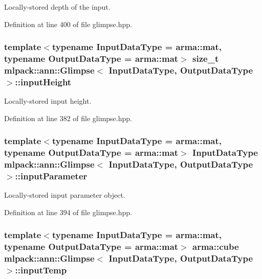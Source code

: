 Locally-\/stored depth of the input. 



Definition at line 400 of file glimpse.\+hpp.

\subsubsection[{input\+Height}]{\setlength{\rightskip}{0pt plus 5cm}template$<$typename Input\+Data\+Type  = arma\+::mat, typename Output\+Data\+Type  = arma\+::mat$>$ size\+\_\+t {\bf mlpack\+::ann\+::\+Glimpse}$<$ Input\+Data\+Type, Output\+Data\+Type $>$\+::input\+Height\hspace{0.3cm}{\ttfamily [private]}}\label{classmlpack_1_1ann_1_1Glimpse_a6a98b1b52646276f7044fca8fc557069}


Locally-\/stored input height. 



Definition at line 382 of file glimpse.\+hpp.

\subsubsection[{input\+Parameter}]{\setlength{\rightskip}{0pt plus 5cm}template$<$typename Input\+Data\+Type  = arma\+::mat, typename Output\+Data\+Type  = arma\+::mat$>$ Input\+Data\+Type {\bf mlpack\+::ann\+::\+Glimpse}$<$ Input\+Data\+Type, Output\+Data\+Type $>$\+::input\+Parameter\hspace{0.3cm}{\ttfamily [private]}}\label{classmlpack_1_1ann_1_1Glimpse_adbe47d5db96da49bab3e7cfbcd9140fe}


Locally-\/stored input parameter object. 



Definition at line 394 of file glimpse.\+hpp.

\subsubsection[{input\+Temp}]{\setlength{\rightskip}{0pt plus 5cm}template$<$typename Input\+Data\+Type  = arma\+::mat, typename Output\+Data\+Type  = arma\+::mat$>$ arma\+::cube {\bf mlpack\+::ann\+::\+Glimpse}$<$ Input\+Data\+Type, Output\+Data\+Type $>$\+::input\+Temp\hspace{0.3cm}{\ttfamily [private]}}\label{classmlpack_1_1ann_1_1Glimpse_a3417d34049d922903da51f6e0e473c81}


